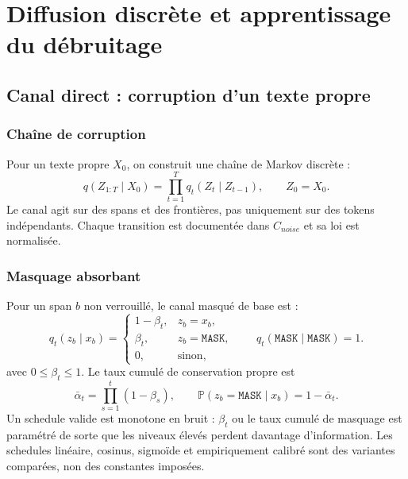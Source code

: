 \documentclass[11pt,a4paper,oneside]{report}
\newcommand{\Mask}{\mathtt{MASK}}
\newcommand{\Prob}{\mathbb{P}}
\begin{document}
\part{Diffusion discrète et apprentissage du débruitage}
\chapter{Canal direct : corruption d'un texte propre}
\section{Chaîne de corruption}
Pour un texte propre $X_0$, on construit une chaîne de Markov discrète :
\[
q(Z_{1:T}\mid X_0)=\prod_{t=1}^{T}q_t(Z_t\mid Z_{t-1}),\qquad Z_0=X_0.
\]
Le canal agit sur des spans et des frontières, pas uniquement sur des tokens indépendants. Chaque transition est documentée dans $C_{noise}$ et sa loi est normalisée.

\section{Masquage absorbant}
Pour un span $b$ non verrouillé, le canal masqué de base est :
\[
q_t(z_b\mid x_b)=
\begin{cases}
1-\beta_t,&z_b=x_b,\\
\beta_t,&z_b=\Mask,\\
0,&\text{sinon},
\end{cases}
\qquad q_t(\Mask\mid\Mask)=1.
\]
avec $0\leq\beta_t\leq1$. Le taux cumulé de conservation propre est
\[
\bar\alpha_t=\prod_{s=1}^{t}(1-\beta_s),\qquad
\Prob(z_b=\Mask\mid x_b)=1-\bar\alpha_t.
\]
Un schedule valide est monotone en bruit : $\beta_t$ ou le taux cumulé de masquage est paramétré de sorte que les niveaux élevés perdent davantage d'information. Les schedules linéaire, cosinus, sigmoïde et empiriquement calibré sont des variantes comparées, non des constantes imposées.
\end{document}
